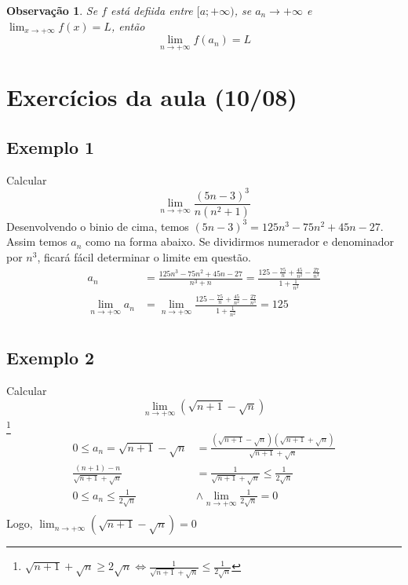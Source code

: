 \documentclass[12pt,openany]{book}
\newtheorem{obs}{Observação}
\begin{document}
\begin{obs} Se $f$ está defiida entre $[a;+\infty)$, se $a_n \rightarrow +\infty$ e $\displaystyle{\lim_{x \rightarrow +\infty} f(x) =L}$, então $$\lim_{n \rightarrow +\infty} f(a_n) =L$$
\end{obs}

\section{Exercícios da aula (10/08)}
\label{sec:s32}

\subsection{Exemplo 1}
\label{subsec:ex321}
\hspace{5mm}Calcular $$\lim_{n \rightarrow +\infty} \frac{(5n-3)^3}{n(n^2+1)}$$
Desenvolvendo o binio de cima, temos $(5n-3)^3 = 125n^3-75n^2+45n -27$. Assim temos $a_n$ como na forma abaixo. Se dividirmos numerador e denominador por $n^3$, ficará fácil determinar o limite em questão.
\begin{align*}
a_n &= \frac{125n^3-75n^2+45n -27}{n^3+n} =  \frac{125 - \frac{75}{n} + \frac{45}{n^2} - \frac{27}{n^3}}{1 + \frac{1}{n^2}} \\
\lim_{n \rightarrow + \infty} a_n &= \lim_{n \rightarrow + \infty} \frac{125 - \frac{75}{n} + \frac{45}{n^2} - \frac{27}{n^3}}{1 + \frac{1}{n^2}} = 125\\
\end{align*}

\subsection{Exemplo 2}
\label{subsec:ex322}
\hspace{5mm}Calcular $$\lim_{n \rightarrow +\infty} (\sqrt{n+1} - \sqrt{n})$$
\footnote{$\sqrt{n+1} + \sqrt{n} \geq 2\sqrt{n} \Longleftrightarrow \frac{1}{\sqrt{n+1} + \sqrt{n}} \leq \frac{1}{2\sqrt{n}} $}
\begin{align*}
0 \leq a_n = \sqrt{n+1} - \sqrt{n} &= \frac{(\sqrt{n+1} - \sqrt{n})(\sqrt{n+1} + \sqrt{n})}{\sqrt{n+1} + \sqrt{n}} \\
\frac{(n+1) - n}{\sqrt{n+1} + \sqrt{n}} &= \frac{1}{\sqrt{n+1} + \sqrt{n}} \leq \frac{1}{2\sqrt{n}}\\
0 \leq a_n \leq \frac{1}{2\sqrt{n}} & \land \lim_{n \rightarrow +\infty}\frac{1}{2\sqrt{n}} = 0  \\
\end{align*}
\hspace{5mm} Logo, $\displaystyle{\lim_{n \rightarrow +\infty} (\sqrt{n+1} - \sqrt{n}) = 0}$
\end{document}
